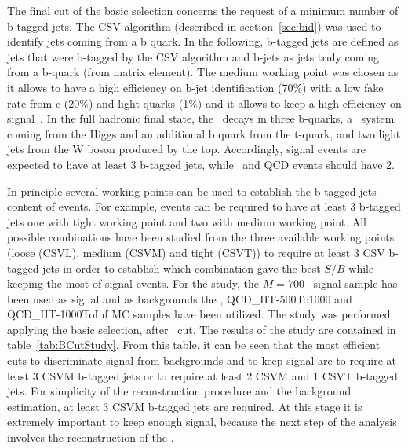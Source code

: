 The final cut of the basic selection concerns the request of a minimum number of b-tagged jets. The CSV algorithm (described in section~\ref{sec:bid}) was used to identify jets coming from a b quark. In the following, b-tagged jets are defined as jets that were b-tagged by the CSV algorithm and b-jets as jets truly coming from a b-quark (from matrix element). The medium working point was chosen as it allows to have a high efficiency on b-jet identification (70\%) with a low fake rate from c (20\%) and light quarks (1\%) and it allows to keep a high efficiency on signal~\cite{Chatrchyan:2012jua, CMS:2013vea}. In the full hadronic final state, the \Tp~decays in three b-quarks, a \bbbar~system coming from the Higgs and an additional b quark from the t-quark, and two light jets from the W boson produced by the top. Accordingly, signal events are expected to have at least 3 b-tagged jets, while \ttbar~and QCD events should have 2.

In principle several working points can be used to establish the b-tagged jets content of events. For example, events can be required to have at least 3 b-tagged jets one with tight working point and two with medium working point. All possible combinations have been studied from the three available working points (loose (CSVL), medium (CSVM) and tight (CSVT)) to require at least 3 CSV b-tagged jets in order to establish which combination gave the best $S/B$ while keeping the most of signal events. For the study, the $M=700$ \GeVcc~signal sample has been used as signal and as backgrounds the \ttbar, QCD\_HT-500To1000 and QCD\_HT-1000ToInf MC samples have been utilized. The study was performed applying the basic selection, after \HT~cut. The results of the study are contained in table~\ref{tab:BCutStudy}. From this table, it can be seen that the most efficient cuts to discriminate signal from backgrounds and to keep signal are to require at least 3 CSVM b-tagged jets or to require at least 2 CSVM and 1 CSVT b-tagged jets. For simplicity of the reconstruction procedure and the background estimation, at least 3 CSVM b-tagged jets are required. At this stage it is extremely important to keep enough signal, because the next step of the analysis involves the reconstruction of the \Tp.

